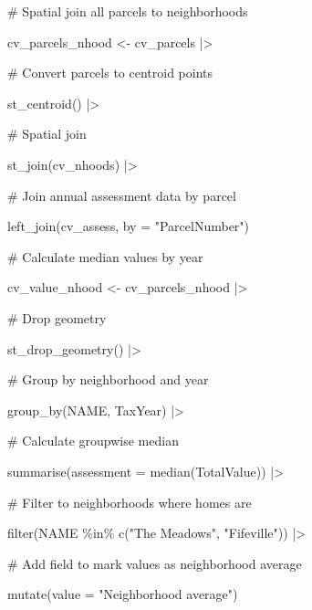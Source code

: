 \documentclass[
  letterpaper,
  DIV=11,
  numbers=noendperiod]{scrartcl}
\newenvironment{Shaded}{\begin{snugshade}}{\end{snugshade}}
\newcommand{\AttributeTok}[1]{\textcolor[rgb]{0.40,0.45,0.13}{#1}}
\newcommand{\CommentTok}[1]{\textcolor[rgb]{0.37,0.37,0.37}{#1}}
\newcommand{\FunctionTok}[1]{\textcolor[rgb]{0.28,0.35,0.67}{#1}}
\newcommand{\NormalTok}[1]{\textcolor[rgb]{0.00,0.23,0.31}{#1}}
\newcommand{\OtherTok}[1]{\textcolor[rgb]{0.00,0.23,0.31}{#1}}
\newcommand{\SpecialCharTok}[1]{\textcolor[rgb]{0.37,0.37,0.37}{#1}}
\newcommand{\StringTok}[1]{\textcolor[rgb]{0.13,0.47,0.30}{#1}}
\begin{document}
\begin{Shaded}
\begin{Highlighting}[]
\CommentTok{\# Spatial join all parcels to neighborhoods}

\NormalTok{cv\_parcels\_nhood }\OtherTok{\textless{}{-}}\NormalTok{ cv\_parcels }\SpecialCharTok{|\textgreater{}} 
  
  \CommentTok{\# Convert parcels to centroid points}
  
  \FunctionTok{st\_centroid}\NormalTok{() }\SpecialCharTok{|\textgreater{}} 
  
  \CommentTok{\# Spatial join}
  
  \FunctionTok{st\_join}\NormalTok{(cv\_nhoods) }\SpecialCharTok{|\textgreater{}} 
  
  \CommentTok{\# Join annual assessment data by parcel}
  
  \FunctionTok{left\_join}\NormalTok{(cv\_assess, }\AttributeTok{by =} \StringTok{"ParcelNumber"}\NormalTok{)}

\CommentTok{\# Calculate median values by year}

\NormalTok{cv\_value\_nhood }\OtherTok{\textless{}{-}}\NormalTok{ cv\_parcels\_nhood }\SpecialCharTok{|\textgreater{}} 
  
  \CommentTok{\# Drop geometry}
  
  \FunctionTok{st\_drop\_geometry}\NormalTok{() }\SpecialCharTok{|\textgreater{}} 
  
  \CommentTok{\# Group by neighborhood and year}
  
  \FunctionTok{group\_by}\NormalTok{(NAME, TaxYear) }\SpecialCharTok{|\textgreater{}} 
  
  \CommentTok{\# Calculate groupwise median}
  
  \FunctionTok{summarise}\NormalTok{(}\AttributeTok{assessment =} \FunctionTok{median}\NormalTok{(TotalValue)) }\SpecialCharTok{|\textgreater{}} 
  
  \CommentTok{\# Filter to neighborhoods where homes are}
  
  \FunctionTok{filter}\NormalTok{(NAME }\SpecialCharTok{\%in\%} \FunctionTok{c}\NormalTok{(}\StringTok{"The Meadows"}\NormalTok{, }\StringTok{"Fifeville"}\NormalTok{)) }\SpecialCharTok{|\textgreater{}} 
  
  \CommentTok{\# Add field to mark values as neighborhood average}
  
  \FunctionTok{mutate}\NormalTok{(}\AttributeTok{value =} \StringTok{"Neighborhood average"}\NormalTok{)}
\end{Highlighting}
\end{Shaded}
\end{document}
